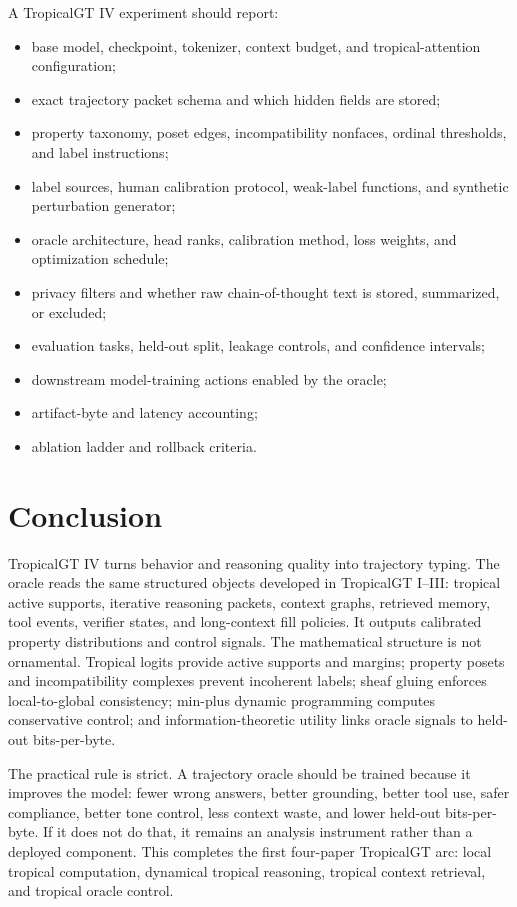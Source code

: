 \documentclass[11pt]{article}
\theoremstyle{definition}
\theoremstyle{remark}
\numberwithin{equation}{section}
\begin{document}
A TropicalGT IV experiment should report:
\begin{itemize}
    \item base model, checkpoint, tokenizer, context budget, and tropical-attention configuration;
    \item exact trajectory packet schema and which hidden fields are stored;
    \item property taxonomy, poset edges, incompatibility nonfaces, ordinal thresholds, and label instructions;
    \item label sources, human calibration protocol, weak-label functions, and synthetic perturbation generator;
    \item oracle architecture, head ranks, calibration method, loss weights, and optimization schedule;
    \item privacy filters and whether raw chain-of-thought text is stored, summarized, or excluded;
    \item evaluation tasks, held-out split, leakage controls, and confidence intervals;
    \item downstream model-training actions enabled by the oracle;
    \item artifact-byte and latency accounting;
    \item ablation ladder and rollback criteria.
\end{itemize}

\section{Conclusion}

TropicalGT IV turns behavior and reasoning quality into trajectory typing.  The oracle reads the same structured objects developed in TropicalGT I--III: tropical active supports, iterative reasoning packets, context graphs, retrieved memory, tool events, verifier states, and long-context fill policies.  It outputs calibrated property distributions and control signals.  The mathematical structure is not ornamental.  Tropical logits provide active supports and margins; property posets and incompatibility complexes prevent incoherent labels; sheaf gluing enforces local-to-global consistency; min-plus dynamic programming computes conservative control; and information-theoretic utility links oracle signals to held-out bits-per-byte.

The practical rule is strict.  A trajectory oracle should be trained because it improves the model: fewer wrong answers, better grounding, better tool use, safer compliance, better tone control, less context waste, and lower held-out bits-per-byte.  If it does not do that, it remains an analysis instrument rather than a deployed component.  This completes the first four-paper TropicalGT arc: local tropical computation, dynamical tropical reasoning, tropical context retrieval, and tropical oracle control.
\end{document}
